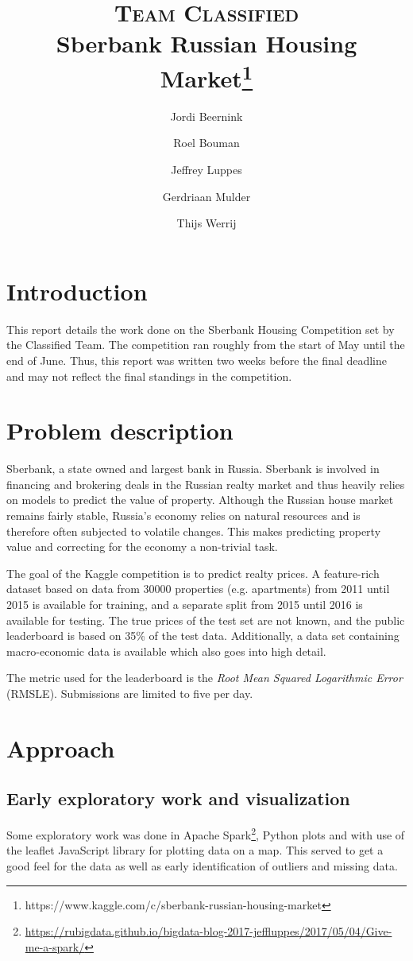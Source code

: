 \documentclass[a4paper,11pt,twocolumn]{article}
\title{\textsc{Team Classified} \\ \small{Sberbank Russian Housing
Market\footnote{https://www.kaggle.com/c/sberbank-russian-housing-market}}}
\author{Jordi Beernink \and Roel Bouman \and Jeffrey Luppes \and Gerdriaan Mulder \and Thijs Werrij}
\begin{document}
\maketitle

\section{Introduction}
This report details the work done on the Sberbank Housing Competition set by the
Classified Team. The competition ran roughly from the start of May until the end
of June. Thus, this report was written two weeks before the final deadline and
may not reflect the final standings in the competition.

\section{Problem description}
Sberbank, a state owned and largest bank in Russia. Sberbank is involved in
financing and brokering deals in the Russian realty market and thus heavily
relies on models to predict the value of property. Although the Russian house
market remains fairly stable, Russia's economy relies on natural resources and
is therefore often subjected to volatile changes. This makes predicting property
value and correcting for the economy a non-trivial task.

The goal of the Kaggle competition is to predict realty prices. A feature-rich
dataset based on data from 30000 properties (e.g. apartments) from 2011 until
2015 is available for training, and a separate split from 2015 until 2016 is
available for testing. The true prices of the test set are not known, and the
public leaderboard is based on 35\% of the test data. Additionally, a data set
containing macro-economic data is available which also goes into high detail.

The metric used for the leaderboard is the \emph{Root Mean Squared
Logarithmic Error} (\mbox{RMSLE}). Submissions are limited to five per day.

\section{Approach}

\subsection{Early exploratory work and visualization}
Some exploratory work was done in Apache
Spark\footnote{\url{https://rubigdata.github.io/bigdata-blog-2017-jeffluppes/2017/05/04/Give-me-a-spark/}},
Python plots and with use of the leaflet JavaScript library for plotting data on
a map. This served to get a good feel for the data as well as early
identification of outliers and missing data.
\end{document}
